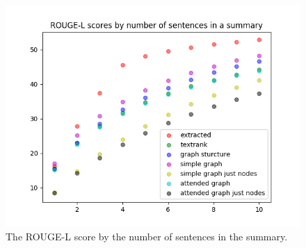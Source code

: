\FloatBarrier

\begin{figure}[!ht]
	\centering
	\includegraphics[width=150mm, keepaspectratio]{figures/ROUGE_L.png}
	\caption{The ROUGE-L score  by the number of sentences in the summary.}
	\label{fig:ROUGE-L}
\end{figure}

